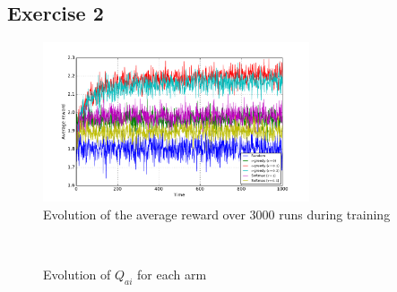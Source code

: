 \documentclass[a4paper]{article}
\begin{document}
\subsection{Exercise 2}
\begin{figure}[H]
	\centering
	\includegraphics[width=0.7\textwidth]{./fig/ex1-2.pdf}
	\caption{Evolution of the average reward over 3000 runs during training}
	\label{ex12perf}
\end{figure}
\begin{figure}[H]
	\centering
	\\
	\caption{Evolution of $Q_{ai}$ for each arm}
	\label{ex12q}
\end{figure}
\end{document}
